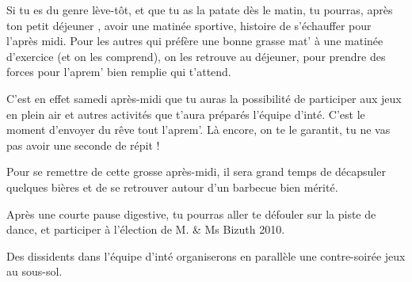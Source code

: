 Si tu es du genre lève-tôt, et que tu as la patate dès le matin, tu pourras,
après ton petit déjeuner , avoir une matinée sportive, histoire de
s'échauffer pour l'après midi. Pour les autres qui préfère une bonne grasse
mat' à une matinée d'exercice (et on les comprend), on les retrouve au
déjeuner, pour prendre des forces pour l'aprem' bien remplie qui t'attend.

C'est en effet samedi après-midi que tu auras la possibilité de participer aux
jeux en plein air et autres activités que t'aura préparés l'équipe d'inté. C'est
le moment d'envoyer du rêve tout l'aprem'. Là encore, on te le garantit, tu ne
vas pas avoir une seconde de répit !

Pour se remettre de cette grosse après-midi, il sera grand temps de décapsuler
quelques bières et de se retrouver autour d'un barbecue bien mérité.

Après une courte pause digestive, tu pourras aller te défouler sur la piste de
dance, et participer à l'élection de M. \& Ms Bizuth 2010.

Des dissidents dans l'équipe d'inté organiserons en parallèle une contre-soirée jeux au
sous-sol.
